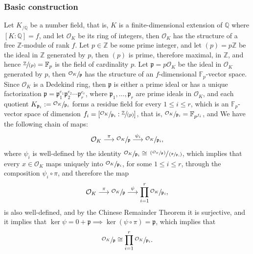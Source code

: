 \documentclass{article}
\begin{document}
\subsubsection{Basic construction}
Let $K_{/\mathbb{Q}}$ be a number field, that is, $K$ is a finite-dimensional extension of $\mathbb{Q}$ where $[K:\mathbb{Q}]=f$, and let $\mathcal{O}_K$ be its ring of integers, then $\mathcal{O}_K$ has the structure of a free $\mathbb{Z}$-module of rank $f$.
Let $p\in\mathbb{Z}$ be some prime integer, and let $(p)=p\mathbb{Z}$ be the ideal in $\mathbb{Z}$ generated by $p$, then $(p)$ is prime, therefore maximal, in $\mathbb{Z}$, and hence $\sfrac{\mathbb{Z}}{(p)}=\mathbb{F}_p$ is the field of cardinality $p$.
Let $\mathfrak{p}=p\mathcal{O}_K$ be the ideal in $\mathcal{O}_K$ generated by $p$, then $\sfrac{\mathcal{O}_K}{\mathfrak{p}}$ has the structure of an $f$-dimensional $\mathbb{F}_p$-vector space. 
Since $\mathcal{O}_K$ is a Dedekind ring, then $\mathfrak{p}$ is either a prime ideal or has a unique factorization $\mathfrak{p}=\mathfrak{p}_1^{e_1}\mathfrak{p}_2^{e_2}\cdots\mathfrak{p}_r^{e_r}$, where $\mathfrak{p}_1,\dots,\mathfrak{p}_r$ are prime ideals in $\mathcal{O}_K$, and each quotient $K_{\mathfrak{p}_i}:=\sfrac{\mathcal{O}_K}{\mathfrak{p}_i}$ forms a residue field for every $1\leq{i}\leq{r}$, which is an $\mathbb{F}_p$-vector space of dimension $f_i=[\sfrac{\mathcal{O}_K}{\mathfrak{p}_i}:\sfrac{\mathbb{Z}}{(p)}]$, that is, $\sfrac{\mathcal{O}_K}{\mathfrak{p}_i}=\mathbb{F}_{p^{f_i}}$, and We have the following chain of maps:
\[
\mathcal{O}_K\overset{\pi}{\longrightarrow}\sfrac{\mathcal{O}_K}{\mathfrak{p}}\overset{\psi_i}{\longrightarrow}\sfrac{\mathcal{O}_K}{\mathfrak{p}_i},
\]
where $\psi_i$ is well-defined by the identity $\sfrac{\mathcal{O}_K}{\mathfrak{p}_i}\cong\sfrac{\left(\sfrac{\mathcal{O}_K}{\mathfrak{p}}\right)}{\left(\sfrac{\mathfrak{p}}{\mathfrak{p}_i}\right)}$, which implies that every $x\in\mathcal{O}_K$ maps uniquely into $\sfrac{\mathcal{O}_K}{\mathfrak{p}_i}$, for some $1\leq{i}\leq{r}$, through the composition $\psi_i\circ\pi$, and therefore the map
\[
\mathcal{O}_K\overset{\pi}{\longrightarrow}\sfrac{\mathcal{O}_K}{\mathfrak{p}}\overset{\psi}{\longrightarrow}\prod_{i=1}^r\sfrac{\mathcal{O}_K}{\mathfrak{p}_i},
\]
is also well-defined, and by the Chinese Remainder Theorem it is surjective, and it implies that $\ker\psi=0+\mathfrak{p}\implies\ker\left(\psi\circ\pi\right)=\mathfrak{p}$, which implies that 
\[\sfrac{\mathcal{O}_{K}}{\mathfrak{p}}\cong\prod_{i=1}^r\sfrac{\mathcal{O}_K}{\mathfrak{p}_i}.\]
\end{document}
